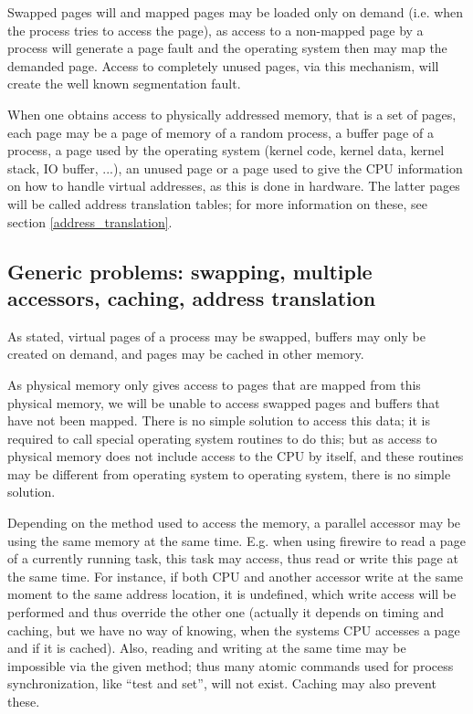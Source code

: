 Swapped pages will and mapped pages may be loaded only on demand (i.e. when the
process tries to access the page), as access to a non-mapped page by a process
will generate a page fault and the operating system then may map the demanded
page.  Access to completely unused pages, via this mechanism, will create the
well known segmentation fault.

When one obtains access to physically addressed memory, that is a set of pages,
each page may be a page of memory of a random process, a buffer page of a
process, a page used by the operating system (kernel code, kernel data, kernel
stack, IO buffer, ...), an unused page or a page used to give the CPU
information on how to handle virtual addresses, as this is done in hardware.
The latter pages will be called address translation tables; for more information
on these, see section \ref{address_translation}.

\pagebreak

\subsection{Generic problems: swapping, multiple accessors, caching, address
translation}

As stated, virtual pages of a process may be swapped, buffers may only be
created on demand, and pages may be cached in other memory.

As physical memory only gives access to pages that are mapped from this
physical memory, we will be unable to access swapped pages and buffers that
have not been mapped. There is no simple solution to access this data; it is
required to call special operating system routines to do this; but as access to
physical memory does not include access to the CPU by itself, and these
routines may be different from operating system to operating system, there is
no simple solution.

Depending on the method used to access the memory, a parallel accessor may be
using the same memory at the same time. E.g. when using firewire to read a page
of a currently running task, this task may access, thus read or write this page
at the same time. For instance, if both CPU and another accessor write at the
same moment to the same address location, it is undefined, which write access
will be performed and thus override the other one (actually it depends on timing
and caching, but we have no way of knowing, when the systems CPU accesses a page
and if it is cached). Also, reading and writing at the same time may be
impossible via the given method; thus many atomic commands used for process
synchronization, like ``test and set'', will not exist.  Caching may also
prevent these.

